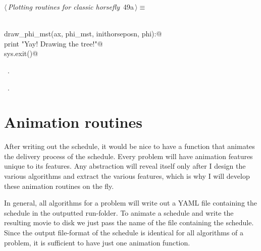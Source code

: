 \documentclass[11.5pt]{report}
\begin{document}
\begin{flushleft} \small\label{scrap70}\raggedright\small
{} $\langle\,${\itshape Plotting routines for classic horsefly}\nobreak\ {\footnotesize {49a}}$\,\rangle\equiv$
\vspace{-1ex}
\begin{list}{}{} \item
\mbox{}\verb@@\\
\mbox{}\verb@def draw_phi_mst(ax, phi_mst, inithorseposn, phi):@\\
\mbox{}\verb@     print "Yay! Drawing the tree!"@\\
\mbox{}\verb@     sys.exit()@\\
\mbox{}\verb@@{\NWsep}
\end{list}
\vspace{-1.5ex}
\footnotesize
\begin{list}{}{\setlength{\itemsep}{-\parsep}\setlength{\itemindent}{-\leftmargin}}
\item \NWtxtMacroDefBy\ .
\item \NWtxtMacroRefIn\ .

\item{}
\end{list}
\vspace{4ex}
\end{flushleft}




\section{Animation routines}

\newchunk 
After writing out the schedule, it would be nice to have a function that animates the 
delivery process of the schedule. Every problem will have animation features unique to
its features. Any abstraction will reveal itself only after I design the various
algorithms and extract the various features, which is why I will develop these animation
routines on the fly. 

In general, all algorithms for a problem will write out a YAML file containing the schedule 
in the outputted run-folder. To animate a schedule and write the resulting movie to disk
we just pass the name of the file containing the schedule. Since the output file-format
of the schedule is identical for all algorithms of a problem, it is sufficient to have
just one animation function. 
\end{document}
